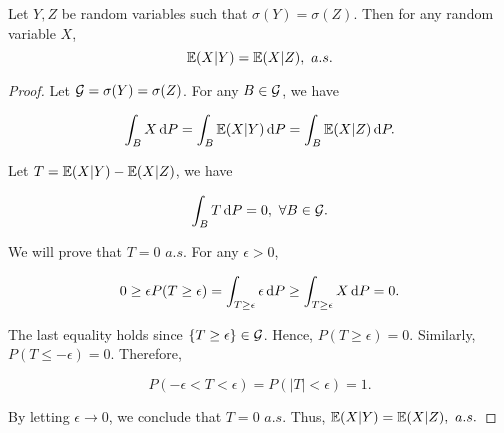 \begin{theorem}
  Let $Y,Z$ be random variables such that $\sigma(Y)=\sigma(Z)$. Then for any random variable $X$,
  $$\mathbb{E}(X|Y)=\mathbb{E}(X|Z),\,\,a.s.$$
\end{theorem}

\begin{proof}
  Let $\mathcal{G}=\sigma(Y)=\sigma(Z)$. For any $B\in\mathcal{G}$, we have

  $$ \int_B X\,\mathrm{d} P=\int_B \mathbb{E}(X|Y)\,\mathrm{d} P=\int_B \mathbb{E}(X|Z)\,\mathrm{d} P.$$

  Let $T=\mathbb{E}(X|Y)-\mathbb{E}(X|Z)$, we have

  $$\int_B T\,\mathrm{d} P = 0,\,\,\forall B\in\mathcal{G}.$$

  We will prove that $T=0 \,\,a.s.$ For any $\epsilon>0$,

  \begin{align*}
    0\ge\epsilon P(T\ge \epsilon) =\int_{T\ge\epsilon}\epsilon\,\mathrm{d} P\ge \int_{T\ge\epsilon}X\,\mathrm{d} P=0.
  \end{align*}

  The last equality holds since $\{T\ge\epsilon\}\in\mathcal{G}$. Hence, $P(T\ge \epsilon)=0$. Similarly, $P(T\le -\epsilon)=0$. Therefore,

  $$P(-\epsilon < T <\epsilon) = P(|T|<\epsilon) = 1.$$

  By letting $\epsilon\to 0$, we conclude that $T=0\,\,a.s.$ Thus, $\mathbb{E}(X|Y)=\mathbb{E}(X|Z),\,\,a.s.$
\end{proof}


